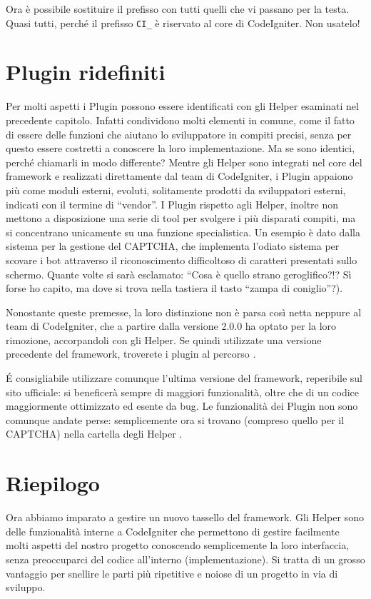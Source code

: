
Ora è possibile sostituire il prefisso con tutti quelli che vi passano per la testa. Quasi tutti, perché il prefisso \verb|CI_| è riservato al core di CodeIgniter. Non usatelo!

\label{cap:plugin}
\section{Plugin ridefiniti}
Per molti aspetti i Plugin possono essere identificati con gli Helper esaminati nel precedente capitolo. Infatti condividono molti elementi in comune, come il fatto di essere delle funzioni che aiutano lo sviluppatore in compiti precisi, senza per questo essere costretti a conoscere la loro implementazione. Ma se sono identici, perché chiamarli in modo differente? Mentre gli Helper sono integrati nel core del framework e realizzati direttamente dal team di CodeIgniter, i Plugin appaiono più come moduli esterni, evoluti, solitamente  prodotti da sviluppatori esterni, indicati con il termine di ``vendor''. I Plugin rispetto agli Helper, inoltre non mettono a disposizione una serie di tool per svolgere i più disparati compiti, ma si concentrano unicamente su una funzione specialistica. Un esempio è dato dalla sistema per la gestione del \ac{CAPTCHA}, che implementa l'odiato sistema per scovare i bot attraverso il riconoscimento difficoltoso di caratteri presentati sullo schermo. Quante volte si sarà esclamato: ``Cosa è quello strano geroglifico?!? Sì forse ho capito, ma dove si trova nella tastiera il tasto ``zampa di coniglio''?).

Nonostante queste premesse, la loro distinzione non è parsa così netta neppure al team di CodeIgniter, che a partire dalla versione 2.0.0 ha optato per la loro rimozione, accorpandoli con gli Helper. Se quindi utilizzate una versione precedente del framework, troverete i plugin al percorso .

\'E consigliabile utilizzare comunque l'ultima versione del framework, reperibile sul sito ufficiale: si beneficerà sempre di maggiori funzionalità, oltre che di un codice maggiormente ottimizzato ed esente da bug. Le funzionalità dei Plugin non sono comunque andate perse: semplicemente ora si trovano (compreso quello per il CAPTCHA) nella cartella degli Helper .

\section{Riepilogo}
Ora abbiamo imparato a gestire un nuovo tassello del framework. Gli Helper sono delle funzionalità interne a CodeIgniter che permettono di gestire facilmente molti aspetti del nostro progetto conoscendo semplicemente la loro interfaccia, senza preoccuparci del codice all'interno (implementazione). Si tratta di un grosso vantaggio per snellire le parti più ripetitive e noiose di un progetto in via di sviluppo.


